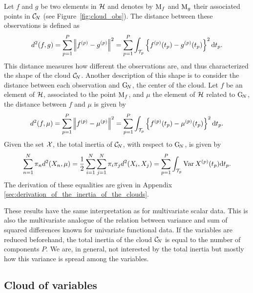 Let $f$ and $g$ be two elements in $\mathcal{H}$ and denotes by $\mathrm{M}_f$ and $\mathrm{M}_g$ their associated points in $\mathcal{C}_{\!N}$ (see Figure~\ref{fig:cloud_obs}). The distance between these observations is defined as
\begin{equation}\label{eq:distance_obs}
    d^2(f, g) = \sum_{p = 1}^P \left|\!\left|f^{(p)} - g^{(p)}\right|\!\right|^2 = \sum_{p = 1}^P \int_{\mathcal{T}_{p}}\left\{f^{(p)}(t_p) - g^{(p)}(t_p)\right\}^2 {\rm d} t_p.
\end{equation}
This distance measures how different the observations are, and thus characterized the shape of the cloud $\mathcal{C}_{\!N}$. Another description of this shape is to consider the distance between each observation and $\mathrm{G}_{\!N}$, the center of the cloud. Let $f$ be an element of $\mathcal{H}$, associated to the point $\mathrm{M}_f$, and $\mu$ the element of $\mathcal{H}$ related to $\mathrm{G}_{\!N}$, the distance between $f$ and $\mu$ is given by
\begin{equation}\label{eq:distance_center}
    d^2(f, \mu) = \sum_{p = 1}^P \left|\!\left|f^{(p)} - \mu^{(p)}\right|\!\right|^2 = \sum_{p = 1}^P \int_{\mathcal{T}_{p}}\left\{f^{(p)}(t_p) - \mu^{(p)}(t_p)\right\}^2 {\rm d} t_p.
\end{equation}
Given the set $\mathcal{X}$, the total inertia of $\mathcal{C}_{\!N}$, with respect to $\mathrm{G}_{\!N}$, is given by
\begin{equation}\label{eq:inertia}
    \sum_{n = 1}^N \pi_n d^2(X_n, \mu) = \frac{1}{2}\sum_{i = 1}^N \sum_{j = 1}^N \pi_i \pi_j d^2(X_i, X_j) = \sum_{p = 1}^P \int_{\mathcal{T}_{p}}\operatorname{Var}{X^{(p)}(t_p)} {\rm d} t_p.
\end{equation}
The derivation of these equalities are given in Appendix \ref{sec:derivation_of_the_inertia_of_the_clouds}.

\begin{remark}
    These results have the same interpretation as for multivariate scalar data. This is also the multivariate analogue of the relation between variance and sum of squared differences known for univariate functional data. If the variables are reduced beforehand, the total inertia of the cloud $\mathcal{C}_{\!N}$ is equal to the number of components $P$. We are, in general, not interested by the total inertia but mostly how this variance is spread among the variables.
\end{remark}


\subsection{Cloud of variables} %
\label{sub:cloud_of_variables}

